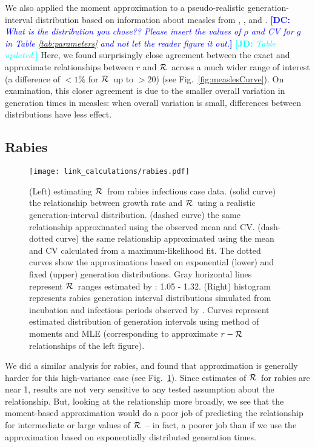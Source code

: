 \documentclass[12pt]{article}
\newcommand{\RR}{\ensuremath{{\cal R}}}
\newcommand{\fref}[1]{Fig.~\ref{fig:#1}}
\newcommand{\comment}[3]{\textcolor{#1}{\textbf{[#2: }\textit{#3}\textbf{]}}}
\newcommand{\jd}[1]{\comment{cyan}{JD}{#1}}
\newcommand{\dc}[1]{\comment{blue}{DC}{#1}}
\begin{document}
We also applied the moment approximation to a pseudo-realistic generation-interval distribution based on information about measles from \cite{LessReic09}, \cite{Lloy01}, and \cite{anderson1982directly}. 
\dc{What is the distribution you chose?? Please insert the values of $\rho$ and CV for $g$ in Table \ref{tab:parameters} and not let the reader figure it out.}
\jd{Table updated.}
Here, we found surprisingly close agreement between the exact and approximate relationships between $r$ and \RR\ across a much wider range of interest (a difference of $<1\%$ for \RR\ up to $>20$) (see \fref{measlesCurve}).
On examination, this closer agreement is due to the smaller overall variation in generation times in measles: when overall variation is small, differences between distributions have less effect.

\subsection{Rabies}
\label{Rabies_example}

\begin{figure}[htbp] \centering
	\texttt{[image: link\_calculations/rabies.pdf]}
	\caption{(Left) estimating \RR~from rabies infectious case data.
		(solid curve) the relationship between growth rate and \RR~using a realistic generation-interval distribution.
		(dashed curve) the same relationship approximated using the observed mean and CV.
		(dash-dotted curve) the same relationship approximated using the mean and CV calculated from a maximum-likelihood fit.
		The dotted curves show the approximations based on exponential (lower) and fixed (upper) generation distributions.
		Gray horizontal lines represent \RR\ ranges estimated by \cite{HampDush09}: 1.05 - 1.32.
		(Right) histogram represents rabies generation interval distributions simulated from incubation and infectious periods observed by \cite{HampDush09}.
		Curves represent estimated distribution of generation intervals using method of moments and MLE (corresponding to approximate $r-\RR$ relationships of the left figure).
	}
	\label{fig:rabiesCurve}
\end{figure}

We did a similar analysis for rabies, and found that approximation is generally harder for this high-variance case (see \fref{rabiesCurve}). Since estimates of \RR\ for rabies are near 1, results are not very sensitive to any tested assumption about the relationship. But, looking at the relationship more broadly, we see that the moment-based approximation would do a poor job of predicting the relationship for intermediate or large values of \RR\ -- in fact, a poorer job than if we use the approximation based on exponentially distributed generation times. 
\end{document}
